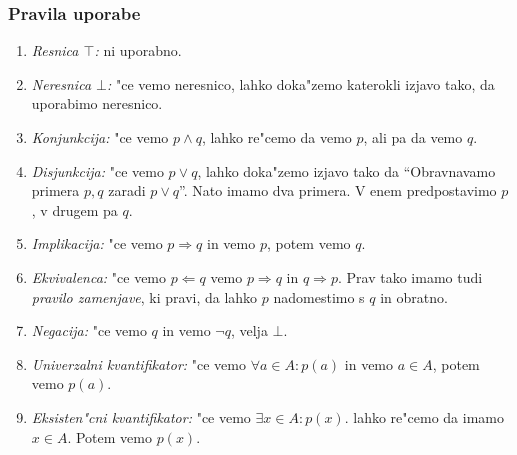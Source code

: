\subsubsection{Pravila uporabe}
\begin{enumerate}
	\item \emph{Resnica $\top$:} ni uporabno.
	\item \emph{Neresnica $\bot$:} "ce vemo neresnico, lahko doka"zemo katerokli izjavo tako, da uporabimo neresnico.
	\item \emph{Konjunkcija:} "ce vemo $p \land q$, lahko re"cemo da vemo $p$, ali pa da vemo $q$.
	\item \emph{Disjunkcija:} "ce vemo $p \lor q$, lahko doka"zemo izjavo tako da ``Obravnavamo primera $p, q$ zaradi $p \lor q$''. Nato imamo dva primera. V enem predpostavimo $p$, v drugem pa $q$.
	\item \emph{Implikacija:} "ce vemo $p \Rightarrow q$ in vemo $p$, potem vemo $q$.
	\item \emph{Ekvivalenca:} "ce vemo $p \Leftarrow q$ vemo $p \Rightarrow q$ in $q \Rightarrow p$. Prav tako imamo tudi \emph{pravilo zamenjave}, ki pravi, da lahko $p$ nadomestimo s $q$ in obratno.
	\item \emph{Negacija:} "ce vemo $q$ in vemo $\lnot q$, velja $\bot$.
	\item \emph{Univerzalni kvantifikator:} "ce vemo $\forall a \in A: p(a)$ in vemo $a \in A$, potem vemo $p(a)$.
	\item \emph{Eksisten"cni kvantifikator:} "ce vemo $\exists x \in A: p(x)$. lahko re"cemo da imamo $x \in A$. Potem vemo $p(x)$.
\end{enumerate}
